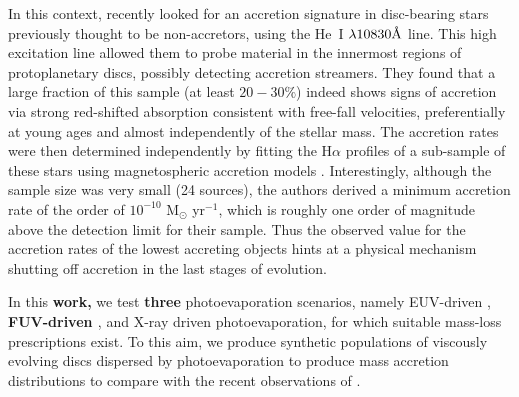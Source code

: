 \documentclass[fleqn,usenatbib]{mnras}
\newcommand{\angstrom}{\mbox{\normalfont\AA}}
\begin{document}
In this context, \citet{Thanathibodee2022} recently looked for an accretion signature in disc-bearing stars previously thought to be non-accretors, using the He~I $\lambda10830 \angstrom$ line. This high excitation line allowed them to probe material in the innermost regions of protoplanetary discs, possibly detecting accretion streamers.
They found that a large fraction of this sample (at least $20-30\%$) indeed shows signs of accretion via strong red-shifted absorption consistent with free-fall velocities, preferentially at young ages and almost independently of the stellar mass.
The accretion rates were then determined independently by fitting the H$\alpha$ profiles of a sub-sample of these stars using magnetospheric accretion models \citep[][from here on ]{Thanathibodee2023}.
Interestingly, although the sample size was very small (24 sources), the authors derived a minimum accretion rate of the order of $10^{-10}$ M$_\odot$ yr$^{-1}$, which is roughly one order of magnitude above the detection limit for their sample. Thus the observed value for the accretion rates of the lowest accreting objects hints at a physical mechanism shutting off accretion in the last stages of evolution. 


In this \textbf{work,} we test \textbf{three} photoevaporation scenarios, namely EUV-driven \citep{Alexander2006}, \textbf{FUV-driven \citep{Komaki2021}}, and X-ray driven \citep{Ercolano2021,Picogna2021} photoevaporation, for which suitable mass-loss prescriptions exist. To this aim, we produce synthetic populations of viscously evolving discs dispersed by photoevaporation to produce mass accretion distributions to compare with the recent observations of . 
\end{document}
